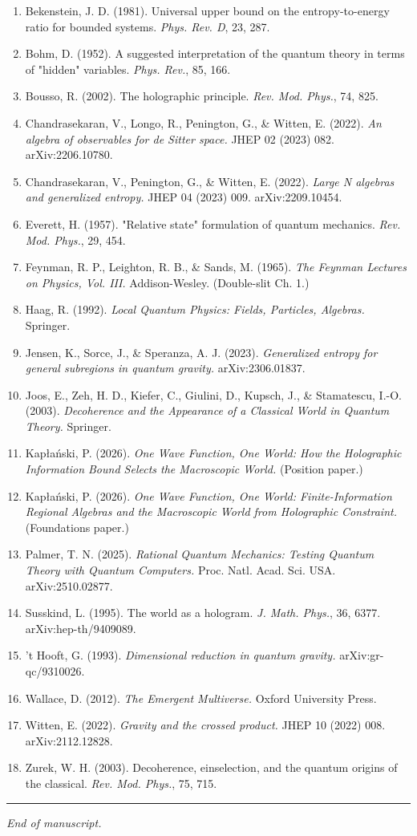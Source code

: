 \documentclass[11pt,a4paper]{article}
\begin{document}
\begin{enumerate}
  \item Bekenstein, J. D. (1981). Universal upper bound on the entropy-to-energy ratio for bounded systems. \emph{Phys. Rev. D}, 23, 287.
  \item Bohm, D. (1952). A suggested interpretation of the quantum theory in terms of "hidden" variables. \emph{Phys. Rev.}, 85, 166.
  \item Bousso, R. (2002). The holographic principle. \emph{Rev. Mod. Phys.}, 74, 825.
  \item Chandrasekaran, V., Longo, R., Penington, G., \& Witten, E. (2022). \emph{An algebra of observables for de Sitter space.} JHEP 02 (2023) 082. arXiv:2206.10780.
  \item Chandrasekaran, V., Penington, G., \& Witten, E. (2022). \emph{Large N algebras and generalized entropy.} JHEP 04 (2023) 009. arXiv:2209.10454.
  \item Everett, H. (1957). "Relative state" formulation of quantum mechanics. \emph{Rev. Mod. Phys.}, 29, 454.
  \item Feynman, R. P., Leighton, R. B., \& Sands, M. (1965). \emph{The Feynman Lectures on Physics, Vol. III.} Addison-Wesley. (Double-slit Ch. 1.)
  \item Haag, R. (1992). \emph{Local Quantum Physics: Fields, Particles, Algebras.} Springer.
  \item Jensen, K., Sorce, J., \& Speranza, A. J. (2023). \emph{Generalized entropy for general subregions in quantum gravity.} arXiv:2306.01837.
  \item Joos, E., Zeh, H. D., Kiefer, C., Giulini, D., Kupsch, J., \& Stamatescu, I.-O. (2003). \emph{Decoherence and the Appearance of a Classical World in Quantum Theory.} Springer.
  \item Kapłański, P. (2026). \emph{One Wave Function, One World: How the Holographic Information Bound Selects the Macroscopic World.} (Position paper.)
  \item Kapłański, P. (2026). \emph{One Wave Function, One World: Finite-Information Regional Algebras and the Macroscopic World from Holographic Constraint.} (Foundations paper.)
  \item Palmer, T. N. (2025). \emph{Rational Quantum Mechanics: Testing Quantum Theory with Quantum Computers.} Proc. Natl. Acad. Sci. USA. arXiv:2510.02877.
  \item Susskind, L. (1995). The world as a hologram. \emph{J. Math. Phys.}, 36, 6377. arXiv:hep-th/9409089.
  \item 't Hooft, G. (1993). \emph{Dimensional reduction in quantum gravity.} arXiv:gr-qc/9310026.
  \item Wallace, D. (2012). \emph{The Emergent Multiverse.} Oxford University Press.
  \item Witten, E. (2022). \emph{Gravity and the crossed product.} JHEP 10 (2022) 008. arXiv:2112.12828.
  \item Zurek, W. H. (2003). Decoherence, einselection, and the quantum origins of the classical. \emph{Rev. Mod. Phys.}, 75, 715.
\end{enumerate}

\medskip\hrule\medskip

\emph{End of manuscript.}
\end{document}
